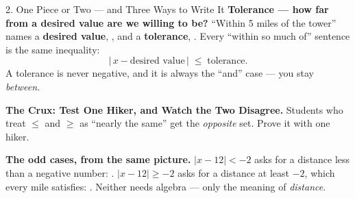 \documentclass[12pt]{article}
\begin{document}
\begin{notesbox}{2. One Piece or Two --- and Three Ways to Write It}
\vspace{5pt}
\textbf{Tolerance --- how far from a desired value are we willing to be?} ``Within 5 miles of
the tower'' names a \textbf{desired value}, , and a \textbf{tolerance}, .
Every ``within so much of'' sentence is the same inequality:
\[ |\,x - \text{desired value}\,| \;\le\; \text{tolerance}. \]
A tolerance is never negative, and it is always the ``and'' case --- you stay \emph{between}.

\vspace{8pt}
\textbf{\textcolor{forest}{The Crux: Test One Hiker, and Watch the Two Disagree.}}
Students who treat $\le$ and $\ge$ as ``nearly the same'' get the \emph{opposite} set. Prove it
with one hiker.

\vspace{3pt}
\begin{center}
\end{center}

\vspace{4pt}
\textbf{The odd cases, from the same picture.} $|x-12| < -2$ asks for a distance less than a
negative number: . $|x-12| \ge -2$ asks for a distance at least $-2$, which every
mile satisfies: . Neither needs algebra --- only the meaning of \emph{distance}.
\end{notesbox}

\vspace{6pt}
\end{document}

